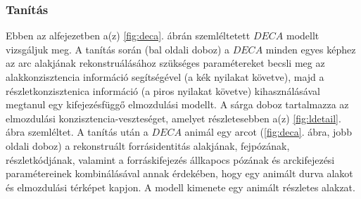 \documentclass[12pt,a4]{article}
\begin{document}
            \subsubsection{Tanítás}
                Ebben az alfejezetben a(z) \ref{fig:deca}. ábrán szemléltetett $DECA$ modellt vizsgáljuk meg.
     	          A tanítás során (bal oldali doboz) a $DECA$ minden egyes képhez
     	          az arc alakjának rekonstruálásához szükséges paramétereket becsli meg az
     	          alakkonzisztencia információ segítségével (a kék nyilakat követve), majd
     	          a részletkonzisztenica információ (a piros nyilakat követve) kihasználásával
     	          megtanul egy kifejezésfüggő elmozdulási modellt. A sárga doboz tartalmazza
     	          az elmozdulási konzisztencia-veszteséget, amelyet részletesebben
                a(z) \ref{fig:ldetail}. ábra szemléltet.
     	          A tanítás után a $DECA$ animál egy arcot (\ref{fig:deca}. ábra, 
                jobb oldali doboz) a rekonstruált forrásidentitás alakjának, fejpózának, részletkódjának, valamint a forráskifejezés állkapocs pózának és arckifejezési paramétereinek kombinálásával annak érdekében, hogy egy animált durva alakot és elmozdulási térképet kapjon. A modell kimenete egy animált
     	          részletes alakzat.
\end{document}
